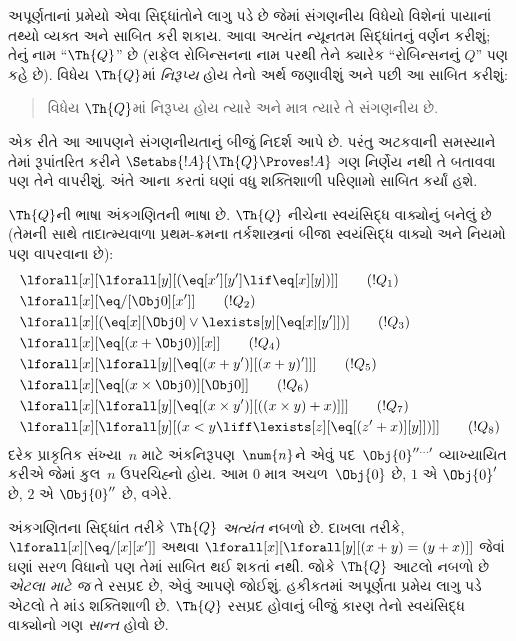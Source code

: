 \begingroup
\makeatletter{}\makeatother

\label{guunit:OLP-0290}


અપૂર્ણતાનાં પ્રમેયો એવા સિદ્ધાંતોને લાગુ
પડે છે જેમાં સંગણનીય વિધેયો વિશેનાં
પાયાનાં તથ્યો વ્યક્ત અને સાબિત કરી
શકાય. આવા અત્યંત ન્યૂનતમ સિદ્ધાંતનું
વર્ણન કરીશું; તેનું નામ
``$\Th{Q}$'' છે (રાફેલ રોબિન્સનના
નામ પરથી તેને ક્યારેક
``રોબિન્સનનું $Q$'' પણ કહે છે).
વિધેય $\Th{Q}$માં \emph{નિરૂપ્ય}
હોય તેનો અર્થ જણાવીશું અને પછી આ
સાબિત કરીશું:
\begin{quote}
  વિધેય $\Th{Q}$માં નિરૂપ્ય હોય
  ત્યારે અને માત્ર ત્યારે તે સંગણનીય છે.
\end{quote}
એક રીતે આ આપણને સંગણનીયતાનું બીજું
નિદર્શ આપે છે. પરંતુ અટકવાની
સમસ્યાને તેમાં રૂપાંતરિત કરીને
$\Setabs{!A}{\Th{Q} \Proves !A}$
ગણ નિર્ણેય નથી તે બતાવવા પણ તેને
વાપરીશું. અંતે આના કરતાં ઘણાં વધુ
શક્તિશાળી પરિણામો સાબિત કર્યાં હશે.

$\Th{Q}$ની ભાષા અંકગણિતની ભાષા છે.
$\Th{Q}$ નીચેના સ્વયંસિદ્ધ વાક્યોનું
બનેલું છે (તેમની સાથે
તાદાત્મ્યવાળા પ્રથમ-ક્રમના
તર્કશાસ્ત્રનાં બીજા સ્વયંસિદ્ધ વાક્યો
અને નિયમો પણ વાપરવાના છે):
\begin{align*}
& \lforall[x][\lforall[y][(\eq[x'][y'] \lif \eq[x][y])]] \tag{$!Q_1$}\\
& \lforall[x][\eq/[\Obj 0][x']] \tag{$!Q_2$}\\
& \lforall[x][(\eq[x][\Obj 0] \lor \lexists[y][\eq[x][y']])] \tag{$!Q_3$}\\
& \lforall[x][\eq[(x + \Obj 0)][x]] \tag{$!Q_4$}\\
& \lforall[x][\lforall[y][\eq[(x + y')][(x + y)']]] \tag{$!Q_5$}\\
& \lforall[x][\eq[(x \times \Obj 0)][\Obj 0]] \tag{$!Q_6$}\\
& \lforall[x][\lforall[y][\eq[(x \times y')][((x \times y) + x)]]] \tag{$!Q_7$}\\
& \lforall[x][\lforall[y][(x < y \liff \lexists[z][\eq[(z' + x)][y]])]] \tag{$!Q_8$}
\end{align*}
દરેક પ્રાકૃતિક સંખ્યા~$n$ માટે
અંકનિરૂપણ~$\num{n}$ને એવું
પદ~$\Obj{0}^{\prime\prime\ldots\prime}$
વ્યાખ્યાયિત કરીએ જેમાં કુલ~$n$
ઉપરચિહ્નો હોય. આમ $\num{0}$
માત્ર અચળ~$\Obj{0}$ છે,
$\num{1}$ એ $\Obj{0}'$ છે,
$\num{2}$ એ $\Obj{0}''$ છે, વગેરે.

અંકગણિતના સિદ્ધાંત તરીકે
$\Th{Q}$ \emph{અત્યંત} નબળો છે.
દાખલા તરીકે,
$\lforall[x][\eq/[x][x']]$ અથવા
$\lforall[x][\lforall[y][(x + y) = (y +
    x)]]$ જેવાં ઘણાં સરળ વિધાનો પણ
તેમાં સાબિત થઈ શકતાં નથી. જોકે
$\Th{Q}$ આટલો નબળો છે \emph{એટલા
માટે જ} તે રસપ્રદ છે, એવું આપણે
જોઈશું. હકીકતમાં અપૂર્ણતા પ્રમેય
લાગુ પડે એટલો તે માંડ શક્તિશાળી છે.
$\Th{Q}$ રસપ્રદ હોવાનું બીજું કારણ
તેનો સ્વયંસિદ્ધ વાક્યોનો ગણ
\emph{સાન્ત} હોવો છે.


